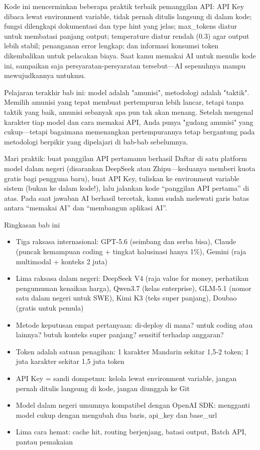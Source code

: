 Kode ini mencerminkan beberapa praktik terbaik pemanggilan API: API Key dibaca lewat environment variable, tidak pernah ditulis langsung di dalam kode; fungsi dilengkapi dokumentasi dan type hint yang jelas; max\_tokens diatur untuk membatasi panjang output; temperature diatur rendah (0.3) agar output lebih stabil; penanganan error lengkap; dan informasi konsumsi token dikembalikan untuk pelacakan biaya. Saat kamu memakai AI untuk menulis kode ini, sampaikan saja persyaratan-persyaratan tersebut—AI sepenuhnya mampu mewujudkannya untukmu.

Pelajaran terakhir bab ini: model adalah "amunisi", metodologi adalah "taktik". Memilih amunisi yang tepat membuat pertempuran lebih lancar, tetapi tanpa taktik yang baik, amunisi sebanyak apa pun tak akan menang. Setelah mengenal karakter tiap model dan cara memakai API, Anda punya "gudang amunisi" yang cukup—tetapi bagaimana memenangkan pertempurannya tetap bergantung pada metodologi berpikir yang dipelajari di bab-bab sebelumnya.

\begin{tcbpractice}{Mari praktik: buat panggilan API pertamamu berhasil}
Daftar di satu platform model dalam negeri (disarankan DeepSeek atau Zhipu—keduanya memberi kuota gratis bagi pengguna baru), buat API Key, tuliskan ke environment variable sistem (bukan ke dalam kode!), lalu jalankan kode “panggilan API pertama” di atas. Pada saat jawaban AI berhasil tercetak, kamu sudah melewati garis batas antara “memakai AI” dan “membangun aplikasi AI”.

\end{tcbpractice}

\begin{tcbsummary}{Ringkasan bab ini}
\begin{itemize}
  \item Tiga raksasa internasional: GPT-5.6 (seimbang dan serba bisa), Claude (puncak kemampuan coding + tingkat halusinasi hanya 1\%), Gemini (raja multimodal + konteks 2 juta)
  \item Lima raksasa dalam negeri: DeepSeek V4 (raja value for money, perhatikan pengumuman kenaikan harga), Qwen3.7 (kelas enterprise), GLM-5.1 (nomor satu dalam negeri untuk SWE), Kimi K3 (teks super panjang), Doubao (gratis untuk pemula)
  \item Metode keputusan empat pertanyaan: di-deploy di mana? untuk coding atau lainnya? butuh konteks super panjang? sensitif terhadap anggaran?
  \item Token adalah satuan penagihan: 1 karakter Mandarin sekitar 1,5-2 token; 1 juta karakter sekitar 1,5 juta token
  \item API Key = sandi dompetmu: kelola lewat environment variable, jangan pernah ditulis langsung di kode, jangan diunggah ke Git
  \item Model dalam negeri umumnya kompatibel dengan OpenAI SDK: mengganti model cukup dengan mengubah dua baris, api\_key dan base\_url
  \item Lima cara hemat: cache hit, routing berjenjang, batasi output, Batch API, pantau pemakaian
\end{itemize}

\end{tcbsummary}
